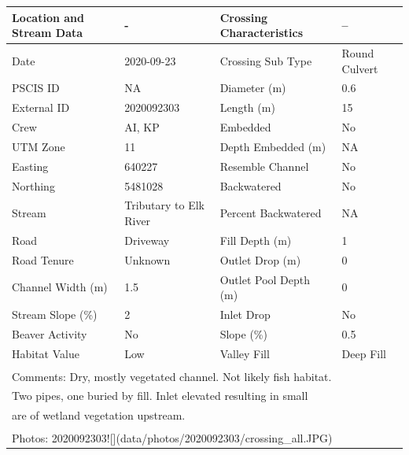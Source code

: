 \documentclass[
]{book}
\begin{document}
\begin{tabular}{llll}
\toprule
Location and Stream Data & - & Crossing Characteristics & --\\
\midrule
Date & 2020-09-23 & Crossing Sub Type & Round Culvert\\
PSCIS ID & NA & Diameter (m) & 0.6\\
External ID & 2020092303 & Length (m) & 15\\
Crew & AI, KP & Embedded & No\\
UTM Zone & 11 & Depth Embedded (m) & NA\\
\addlinespace
Easting & 640227 & Resemble Channel & No\\
Northing & 5481028 & Backwatered & No\\
Stream & Tributary to Elk River & Percent Backwatered & NA\\
Road & Driveway & Fill Depth (m) & 1\\
Road Tenure & Unknown & Outlet Drop (m) & 0\\
\addlinespace
Channel Width (m) & 1.5 & Outlet Pool Depth (m) & 0\\
Stream Slope (\%) & 2 & Inlet Drop & No\\
Beaver Activity & No & Slope (\%) & 0.5\\
Habitat Value & Low & Valley Fill & Deep Fill\\
\bottomrule
\multicolumn{4}{l}{\textsuperscript{} Comments: Dry, mostly vegetated channel. Not likely fish habitat.}\\
\multicolumn{4}{l}{Two pipes, one buried by fill. Inlet elevated resulting in small}\\
\multicolumn{4}{l}{are of wetland vegetation upstream.}\\
\multicolumn{4}{l}{\textsuperscript{} Photos: 2020092303![](data/photos/2020092303/crossing\_all.JPG)}\\
\end{tabular}
\end{document}
